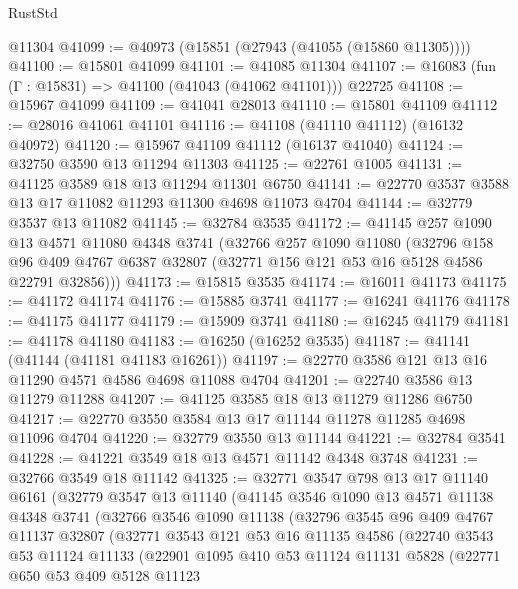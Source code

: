 \begin{lexlean}{RustStd}
\begin{coremodule}
    @11304
@41099 := @40973 (@15851 (@27943 (@41055 (@15860 @11305))))
@41100 := @15801 @41099
@41101 := @41085 @11304
@41107 := @16083 (fun (Γ : @15831) => @41100 (@41043 (@41062 @41101))) @22725
@41108 := @15967 @41099
@41109 := @41041 @28013
@41110 := @15801 @41109
@41112 := @28016 @41061 @41101
@41116 := @41108 (@41110 @41112) (@16132 @40972)
@41120 := @15967 @41109 @41112 (@16137 @41040)
@41124 := @32750 @3590 @13 @11294 @11303
@41125 := @22761 @1005
@41131 := @41125 @3589 @18 @13 @11294 @11301 @6750
@41141 := @22770 @3537 @3588 @13 @17 @11082 @11293 @11300 @4698 @11073 @4704
@41144 := @32779 @3537 @13 @11082
@41145 := @32784 @3535
@41172 := @41145
    @257
    @1090
    @13
    @4571
    @11080
    @4348
    @3741
    (@32766
      @257
      @1090
      @11080
      (@32796
        @158
        @96
        @409
        @4767
        @6387
        @32807
        (@32771 @156 @121 @53 @16 @5128 @4586 @22791 @32856)))
@41173 := @15815 @3535
@41174 := @16011 @41173
@41175 := @41172 @41174
@41176 := @15885 @3741
@41177 := @16241 @41176
@41178 := @41175 @41177
@41179 := @15909 @3741
@41180 := @16245 @41179
@41181 := @41178 @41180
@41183 := @16250 (@16252 @3535)
@41187 := @41141 (@41144 (@41181 @41183 @16261))
@41197 := @22770 @3586 @121 @13 @16 @11290 @4571 @4586 @4698 @11088 @4704
@41201 := @22740 @3586 @13 @11279 @11288
@41207 := @41125 @3585 @18 @13 @11279 @11286 @6750
@41217 := @22770 @3550 @3584 @13 @17 @11144 @11278 @11285 @4698 @11096 @4704
@41220 := @32779 @3550 @13 @11144
@41221 := @32784 @3541
@41228 := @41221 @3549 @18 @13 @4571 @11142 @4348 @3748
@41231 := @32766 @3549 @18 @11142
@41325 := @32771
    @3547
    @798
    @13
    @17
    @11140
    @6161
    (@32779
      @3547
      @13
      @11140
      (@41145
        @3546
        @1090
        @13
        @4571
        @11138
        @4348
        @3741
        (@32766
          @3546
          @1090
          @11138
          (@32796
            @3545
            @96
            @409
            @4767
            @11137
            @32807
            (@32771
              @3543
              @121
              @53
              @16
              @11135
              @4586
              (@22740
                @3543
                @53
                @11124
                @11133
                (@22901
                  @1095
                  @410
                  @53
                  @11124
                  @11131
                  @5828
                  (@22771
                    @650
                    @53
                    @409
                    @5128
                    @11123

\end{coremodule}
\end{lexlean}
